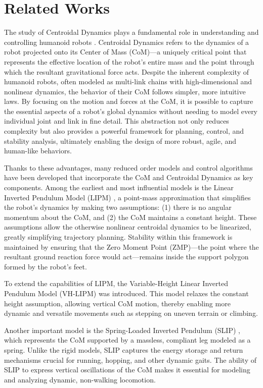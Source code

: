 \documentclass[main.tex]{subfiles}
\begin{document}
\section{Related Works}\label{sec:relatedworks}

The study of Centroidal Dynamics plays a fundamental role in understanding and controlling humanoid robots \cite{CD}. Centroidal Dynamics refers to the dynamics of a robot projected onto its Center of Mass (CoM)—a uniquely critical point that represents the effective location of the robot’s entire mass and the point through which the resultant gravitational force acts. Despite the inherent complexity of humanoid robots, often modeled as multi-link chains with high-dimensional and nonlinear dynamics, the behavior of their CoM follows simpler, more intuitive laws. By focusing on the motion and forces at the CoM, it is possible to capture the essential aspects of a robot's global dynamics without needing to model every individual joint and link in fine detail. This abstraction not only reduces complexity but also provides a powerful framework for planning, control, and stability analysis, ultimately enabling the design of more robust, agile, and human-like behaviors.

Thanks to these advantages, many reduced order models and control algorithms have been developed that incorporate the CoM and Centroidal Dynamics as key components. Among the earliest and most influential models is the Linear Inverted Pendulum Model (LIPM) \cite{LIPM}, a point-mass approximation that simplifies the robot’s dynamics by making two assumptions: (1) there is no angular momentum about the CoM, and (2) the CoM maintains a constant height. These assumptions allow the otherwise nonlinear centroidal dynamics to be linearized, greatly simplifying trajectory planning. Stability within this framework is maintained by ensuring that the Zero Moment Point (ZMP)—the point where the resultant ground reaction force would act—remains inside the support polygon formed by the robot’s feet.

To extend the capabilities of LIPM, the Variable-Height Linear Inverted Pendulum Model (VH-LIPM) \cite{VHLIPM} was introduced. This model relaxes the constant height assumption, allowing vertical CoM motion, thereby enabling more dynamic and versatile movements such as stepping on uneven terrain or climbing.

Another important model is the Spring-Loaded Inverted Pendulum (SLIP) \cite{SLIP}, which represents the CoM supported by a massless, compliant leg modeled as a spring. Unlike the rigid models, SLIP captures the energy storage and return mechanisms crucial for running, hopping, and other dynamic gaits. The ability of SLIP to express vertical oscillations of the CoM makes it essential for modeling and analyzing dynamic, non-walking locomotion.
\end{document}
